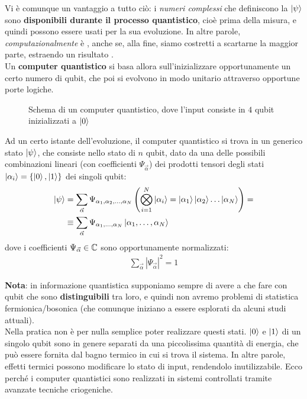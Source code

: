 \documentclass[../../InformazioneQuantistica.tex]{subfiles}
\begin{document}
Vi è comunque un vantaggio a tutto ciò: i \textit{numeri complessi} che definiscono la $\Ket{\psi}$ sono \textbf{disponibili durante il processo quantistico}, cioè prima della misura, e quindi possono essere usati per la sua evoluzione. In altre parole, \textit{computazionalmente} è , anche se, alla fine, siamo costretti a scartarne la maggior parte, estraendo un risultato .\\

Un \textbf{computer quantistico} si basa allora sull'inizializzare opportunamente un certo numero di qubit, che poi si evolvono in modo unitario attraverso opportune porte logiche.

\begin{figure}[H]
\centering

\caption{Schema di un computer quantistico, dove l'input consiste in $4$ qubit inizializzati a $\Ket{0}$\label{fig:computer-quantico}}
\end{figure}

Ad un certo istante dell'evoluzione, il computer quantistico si trova in un generico stato $\Ket{\psi}$, che consiste nello stato di $n$ qubit, dato da una delle possibili combinazioni lineari (con coefficienti $\Psi_{\vec{\alpha}}$) dei prodotti tensori degli stati $\Ket{\alpha_i}=\{\Ket{0},\Ket{1}\}$ dei singoli qubit:
\begin{align*}
\Ket{\psi} &=\sum_{\vec{\alpha}} \Psi_{\alpha_1,\alpha_2,\dots,\alpha_N}\left( \bigotimes_{i=1}^N \Ket{\alpha_i} = \Ket{\alpha_1}\Ket{\alpha_2}\dots\Ket{\alpha_N} \right)=\\
&\equiv\sum_{\vec{\alpha}} \Psi_{\alpha_1, \dots, \alpha_N} \Ket{\alpha_1, \dots, \alpha_N}
\end{align*}
dove i coefficienti $\Psi_{\vec{\alpha}} \in \mathbb{C}$ sono opportunamente normalizzati:
\begin{align*}
\sum_{\vec{\alpha}} \left| \Psi_{\vec{\alpha}}\right|^2 = 1
\end{align*}

\textbf{Nota}: in informazione quantistica supponiamo sempre di avere a che fare con qubit che sono \textbf{distinguibili} tra loro, e quindi non avremo problemi di statistica fermionica/bosonica (che comunque iniziano a essere esplorati da alcuni studi attuali).\\

Nella pratica non è per nulla semplice poter realizzare questi stati. $\Ket{0}$ e $\Ket{1}$ di un singolo qubit sono in genere separati da una piccolissima quantità di energia, che può essere fornita dal bagno termico in cui si trova il sistema. In altre parole, effetti termici possono modificare lo stato di input, rendendolo inutilizzabile. Ecco perché i computer quantistici sono realizzati in sistemi controllati tramite avanzate tecniche criogeniche.\\
\end{document}
